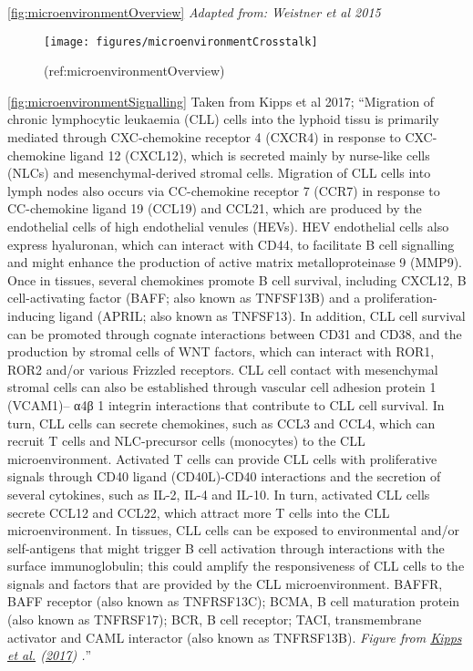 \documentclass[11pt, a4paper, twosided]{book}
\begin{document}
\ref{fig:microenvironmentOverview} \emph{Adapted from: Weistner et al 2015}
\begin{figure}

{\centering \texttt{[image: figures/microenvironmentCrosstalk]} 

}

\caption{(ref:microenvironmentOverview)}\label{fig:microenvironmentCrosstalk}
\end{figure}
\ref{fig:microenvironmentSignalling} Taken from Kipps et al 2017; ``Migration of chronic lymphocytic leukaemia (CLL) cells into the lyphoid tissu is primarily mediated through CXC-chemokine receptor 4 (CXCR4) in response to CXC-chemokine ligand 12 (CXCL12), which is secreted mainly by nurse-like cells (NLCs) and mesenchymal-derived stromal cells. Migration of CLL cells into lymph nodes also occurs via CC-chemokine receptor 7 (CCR7) in response to CC-chemokine ligand 19 (CCL19) and CCL21, which are produced by the endothelial cells of high endothelial venules (HEVs). HEV endothelial cells also express hyaluronan, which can interact with CD44, to facilitate B cell signalling and might enhance the production of active matrix metalloproteinase 9 (MMP9). Once in tissues, several chemokines promote B cell survival, including CXCL12, B cell-activating factor (BAFF; also known as TNFSF13B) and a proliferation-inducing ligand (APRIL; also known as TNFSF13). In addition, CLL cell survival can be promoted through cognate interactions between CD31 and CD38, and the production by stromal cells of WNT factors, which can interact with ROR1, ROR2 and/or various Frizzled receptors. CLL cell contact with mesenchymal stromal cells can also be established through vascular cell adhesion protein 1 (VCAM1)-- α4β 1 integrin interactions that contribute to CLL cell survival. In turn, CLL cells can secrete chemokines, such as CCL3 and CCL4, which can recruit T cells and NLC-precursor cells (monocytes) to the CLL microenvironment. Activated T cells can provide CLL cells with proliferative signals through CD40 ligand (CD40L)-CD40 interactions and the secretion of several cytokines, such as IL-2, IL-4 and IL-10. In turn, activated CLL cells secrete CCL12 and CCL22, which attract more T cells into the CLL microenvironment. In tissues, CLL cells can be exposed to environmental and/or self-antigens that might trigger B cell activation through interactions with the surface immunoglobulin; this could amplify the responsiveness of CLL cells to the signals and factors that are provided by the CLL microenvironment. BAFFR, BAFF receptor (also known as TNFRSF13C); BCMA, B cell maturation protein (also known as TNFRSF17); BCR, B cell receptor; TACI, transmembrane activator and CAML interactor (also known as TNFRSF13B). \emph{Figure from \protect\hyperlink{ref-Kipps2017}{Kipps et al.} (\protect\hyperlink{ref-Kipps2017}{2017}) .}''
\end{document}
